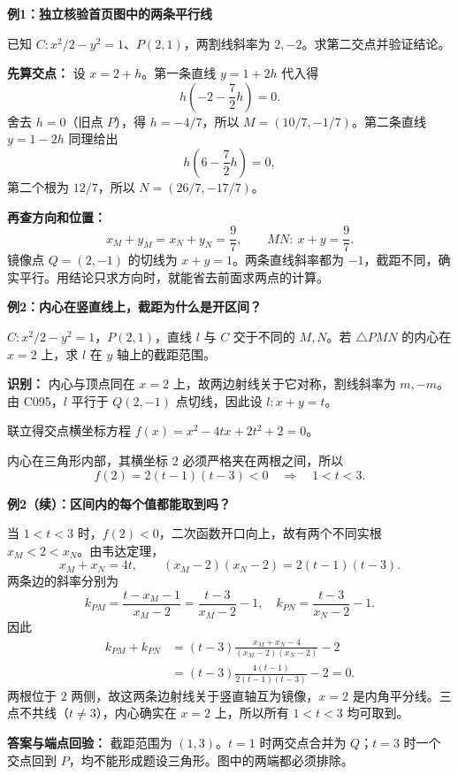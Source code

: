 \clearpage
\begin{examplebox}
\textbf{例1：独立核验首页图中的两条平行线}

已知 $C:x^2/2-y^2=1$、$P(2,1)$，两割线斜率为 $2,-2$。求第二交点并验证结论。

\textbf{先算交点：} 设 $x=2+h$。第一条直线 $y=1+2h$ 代入得
\[
h\left(-2-\frac72h\right)=0.
\]
舍去 $h=0$（旧点 $P$），得 $h=-4/7$，所以 $M=(10/7,-1/7)$。第二条直线 $y=1-2h$ 同理给出
\[
h\left(6-\frac72h\right)=0,
\]
第二个根为 $12/7$，所以 $N=(26/7,-17/7)$。

\textbf{再查方向和位置：}
\[
x_M+y_M=x_N+y_N=\frac97,
\qquad MN:\ x+y=\frac97.
\]
镜像点 $Q=(2,-1)$ 的切线为 $x+y=1$。两条直线斜率都为 $-1$，截距不同，确实平行。用结论只求方向时，就能省去前面求两点的计算。
\end{examplebox}

\clearpage
\begin{examplebox}
\textbf{例2：内心在竖直线上，截距为什么是开区间？}

$C:x^2/2-y^2=1$，$P(2,1)$，直线 $l$ 与 $C$ 交于不同的 $M,N$。若 $\triangle PMN$ 的内心在 $x=2$ 上，求 $l$ 在 $y$ 轴上的截距范围。

\textbf{识别：} 内心与顶点同在 $x=2$ 上，故两边射线关于它对称，割线斜率为 $m,-m$。由 C095，$l$ 平行于 $Q(2,-1)$ 点切线，因此设 $l:x+y=t$。

联立得交点横坐标方程 $f(x)=x^2-4tx+2t^2+2=0$。
\begin{center}

\end{center}

内心在三角形内部，其横坐标 $2$ 必须严格夹在两根之间，所以
\[
f(2)=2(t-1)(t-3)<0\quad\Rightarrow\quad 1<t<3.
\]
\end{examplebox}

\clearpage
\begin{examplebox}
\textbf{例2（续）：区间内的每个值都能取到吗？}

当 $1<t<3$ 时，$f(2)<0$，二次函数开口向上，故有两个不同实根 $x_M<2<x_N$。由韦达定理，
\[
x_M+x_N=4t,\qquad
(x_M-2)(x_N-2)=2(t-1)(t-3).
\]
两条边的斜率分别为
\[
k_{PM}=\frac{t-x_M-1}{x_M-2}=\frac{t-3}{x_M-2}-1,
\quad
k_{PN}=\frac{t-3}{x_N-2}-1.
\]
因此
\[
\begin{aligned}
k_{PM}+k_{PN}
&=(t-3)\frac{x_M+x_N-4}{(x_M-2)(x_N-2)}-2\\
&=(t-3)\frac{4(t-1)}{2(t-1)(t-3)}-2=0.
\end{aligned}
\]
两根位于 $2$ 两侧，故这两条边射线关于竖直轴互为镜像，$x=2$ 是内角平分线。三点不共线（$t\ne3$），内心确实在 $x=2$ 上，所以所有 $1<t<3$ 均可取到。

\medskip
\textbf{答案与端点回验：} 截距范围为 $\boxed{(1,3)}$。$t=1$ 时两交点合并为 $Q$；$t=3$ 时一个交点回到 $P$，均不能形成题设三角形。图中的两端都必须排除。
\end{examplebox}

